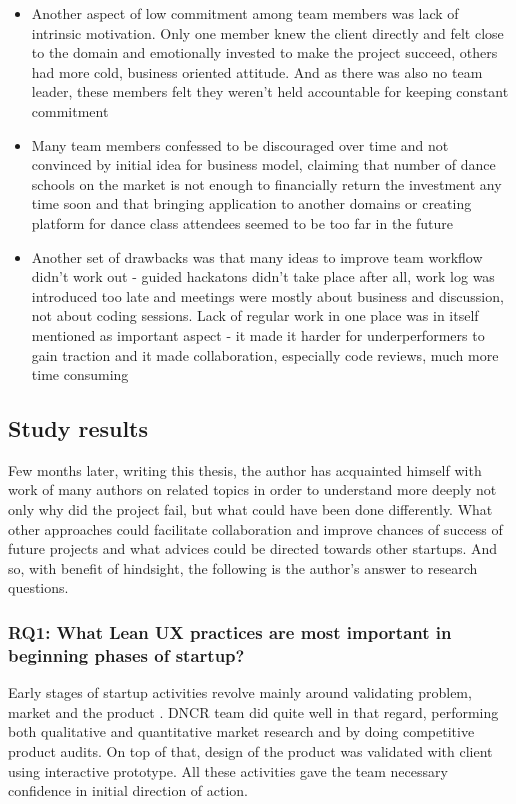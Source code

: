 \documentclass{article}
\begin{document}
\begin{itemize}
\item Another aspect of low commitment among team members was lack of intrinsic motivation. Only one member knew the client directly and felt close to the domain and emotionally invested to make the project succeed, others had more cold, business oriented attitude. And as there was also no team leader, these members felt they weren't held accountable for keeping constant commitment
\item Many team members confessed to be discouraged over time and not convinced by initial idea for business model, claiming that number of dance schools on the market is not enough to financially return the investment any time soon and that bringing application to another domains or creating platform for dance class attendees seemed to be too far in the future
\item Another set of drawbacks was that many ideas to improve team workflow didn't work out - guided hackatons didn't take place after all, work log was introduced too late and meetings were mostly about business and discussion, not about coding sessions. Lack of regular work in one place was in itself mentioned as important aspect - it made it harder for underperformers to gain traction and it made collaboration, especially code reviews, much more time consuming
\end{itemize}

\subsection{Study results}
\label{sec:research-questions}
Few months later, writing this thesis, the author has acquainted himself with work of many authors on related topics in order to understand more deeply not only why did the project fail, but what could have been done differently. What other approaches could facilitate collaboration and improve chances of success of future projects and what advices could be directed towards other startups. And so, with benefit of hindsight, the following is the author's answer to research questions.


\subsubsection{RQ1: What Lean UX practices are most important in beginning phases of startup?}
Early stages of startup activities revolve mainly around validating problem, market and the product \citep{klein2013ux}. DNCR team did quite well in that regard, performing both qualitative and quantitative market research and by doing competitive product audits. On top of that, design of the product was validated with client using interactive prototype. All these activities gave the team necessary confidence in initial direction of action.
\end{document}

